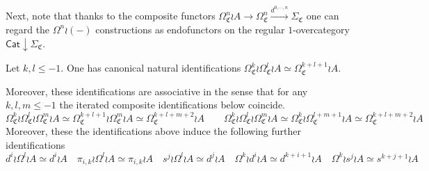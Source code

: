 \documentclass[a4paper,10pt
,draft
]{article}%
\renewcommand{\1}{\eta}%
\begin{document}
Next, note that thanks to the composite functors 
$\Omega^n_{\mathfrak{C}} \wr A \to \Omega^n_{\mathfrak{C}} 
\xrightarrow{d^{0,\cdots,n}} \Sigma_{\mathfrak{C}}$
one can regard the $\Omega^n \wr (-)$ constructions
as endofunctors on the regular $1$-overcategory
$\mathsf{Cat} \downarrow \Sigma_{\mathfrak{C}}$.



\begin{proposition}\label{ASSOCIDS PROP}
Let $k,l\leq -1$. One has canonical natural identifications 
$\Omega^k_{\mathfrak{C}} \wr \Omega^l_{\mathfrak{C}} \wr A
\simeq 
\Omega^{k+l+1}_{\mathfrak{C}} \wr A $.

Moreover, these identifications are associative in the sense that for any $k,l,m \leq -1$ the iterated composite identifications below coincide.
\[
\Omega^k_{\mathfrak{C}} \wr \Omega^l_{\mathfrak{C}} \wr \Omega^m_{\mathfrak{C}} \wr A
	\simeq 
\Omega^{k+l+1}_{\mathfrak{C}} \wr \Omega^m_{\mathfrak{C}} \wr A
	\simeq 
\Omega^{k+l+m+2}_{\mathfrak{C}} \wr A
\qquad
\Omega^k_{\mathfrak{C}} \wr \Omega^l_{\mathfrak{C}} \wr \Omega^m_{\mathfrak{C}} \wr A
	\simeq 
\Omega^{k}_{\mathfrak{C}} \wr \Omega^{l+m+1}_{\mathfrak{C}} \wr A
	\simeq 
\Omega^{k+l+m+2}_{\mathfrak{C}} \wr A
\]
Moreover, these the identifications above induce the following further identifications
\[
d^i \wr \Omega^l \wr A \simeq d^i \wr A
	\quad
\pi_{i,k} \wr \Omega^l \wr A \simeq \pi_{i,k} \wr A
	\quad
s^j \wr \Omega^l \wr A \simeq d^j \wr A
	\quad
\Omega^k \wr d^i \wr A \simeq d^{k+i+1} \wr A
	\quad
\Omega^k \wr s^j \wr A \simeq s^{k+j+1} \wr A
\]
\end{proposition}
\end{document}
